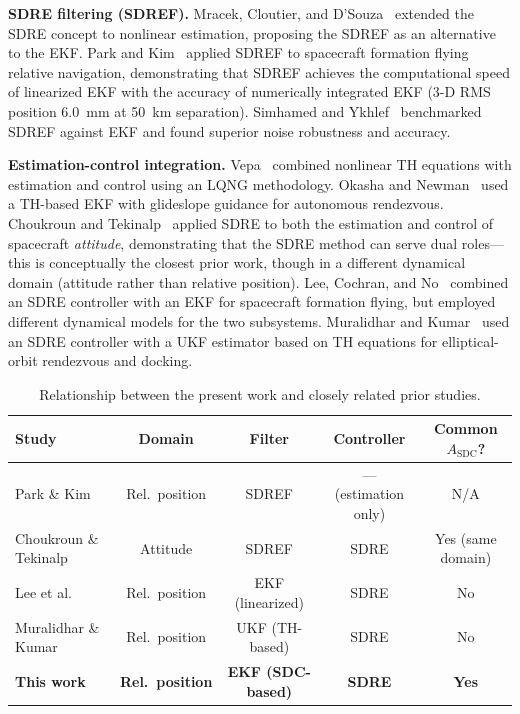 \documentclass[preprint,3p,times]{elsarticle}
\begin{document}
\textbf{SDRE filtering (SDREF).} Mracek, Cloutier, and D'Souza~\cite{Mracek1996} extended the SDRE concept to nonlinear estimation, proposing the SDREF as an alternative to the EKF. Park and Kim~\cite{Park2016} applied SDREF to spacecraft formation flying relative navigation, demonstrating that SDREF achieves the computational speed of linearized EKF with the accuracy of numerically integrated EKF (3-D RMS position 6.0~mm at 50~km separation). Simhamed and Ykhlef~\cite{Simhamed2021} benchmarked SDREF against EKF and found superior noise robustness and accuracy.

\textbf{Estimation-control integration.} Vepa~\cite{Vepa2018} combined nonlinear TH equations with estimation and control using an LQNG methodology. Okasha and Newman~\cite{Okasha2011} used a TH-based EKF with glideslope guidance for autonomous rendezvous. Choukroun and Tekinalp~\cite{Choukroun2013} applied SDRE to both the estimation and control of spacecraft \emph{attitude}, demonstrating that the SDRE method can serve dual roles---this is conceptually the closest prior work, though in a different dynamical domain (attitude rather than relative position). Lee, Cochran, and No~\cite{Lee2012} combined an SDRE controller with an EKF for spacecraft formation flying, but employed different dynamical models for the two subsystems. Muralidhar and Kumar~\cite{Muralidhar2021} used an SDRE controller with a UKF estimator based on TH equations for elliptical-orbit rendezvous and docking.

\begin{table}[h]
\centering
\caption{Relationship between the present work and closely related prior studies.}
\label{tab:prior_work}
\begin{tabular}{lcccc}
\toprule
Study & Domain & Filter & Controller & Common $A_{\text{SDC}}$? \\
\midrule
Park \& Kim~\cite{Park2016} & Rel.\ position & SDREF & --- (estimation only) & N/A \\
Choukroun \& Tekinalp~\cite{Choukroun2013} & Attitude & SDREF & SDRE & Yes (same domain) \\
Lee et al.~\cite{Lee2012} & Rel.\ position & EKF (linearized) & SDRE & No \\
Muralidhar \& Kumar~\cite{Muralidhar2021} & Rel.\ position & UKF (TH-based) & SDRE & No \\
\textbf{This work} & \textbf{Rel.\ position} & \textbf{EKF (SDC-based)} & \textbf{SDRE} & \textbf{Yes} \\
\bottomrule
\end{tabular}
\end{table}
\end{document}
